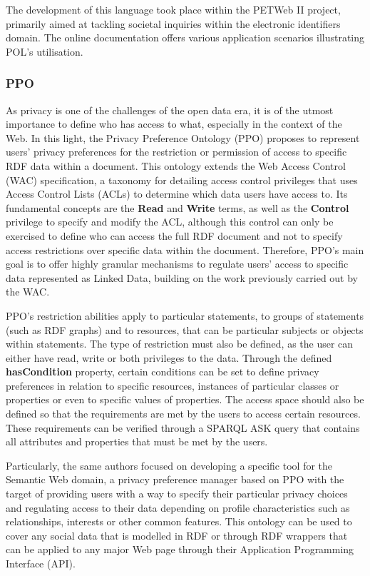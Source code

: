 The development of this language took place within the PETWeb II project, primarily aimed at tackling societal inquiries within the electronic identifiers domain.
The online documentation offers various application scenarios illustrating POL's utilisation.

\subsubsection{PPO}
\label{sec:ppo}
As privacy is one of the challenges of the open data era, it is of the utmost importance to define who has access to what, especially in the context of the Web.
In this light, the Privacy Preference Ontology (PPO) \citep{sacco_privacy_2011} proposes to represent users' privacy preferences for the restriction or permission of access to specific RDF data within a document.
This ontology extends the Web Access Control (WAC) specification, a taxonomy for detailing access control privileges that uses Access Control Lists (ACLs) to determine which data users have access to.
Its fundamental concepts are the \textbf{Read} and \textbf{Write} terms, as well as the \textbf{Control} privilege to specify and modify the ACL, although this control can only be exercised to define who can access the full RDF document and not to specify access restrictions over specific data within the document.
Therefore, PPO's main goal is to offer highly granular mechanisms to regulate users' access to specific data represented as Linked Data, building on the work previously carried out by the WAC.

PPO's restriction abilities apply to particular statements, to groups of statements (such as RDF graphs) and to resources, that can be particular subjects or objects within statements.
The type of restriction must also be defined, as the user can either have read, write or both privileges to the data.
Through the defined \textbf{hasCondition} property, certain conditions can be set to define privacy preferences in relation to specific resources, instances of particular classes or properties or even to specific values of properties.
The access space should also be defined so that the requirements are met by the users to access certain resources.
These requirements can be verified through a SPARQL ASK query that contains all attributes and properties that must be met by the users.

Particularly, the same authors focused on developing a specific tool for the Semantic Web domain, a privacy preference manager \citep{sacco_privacy_2011b} based on PPO with the target of providing users with a way to specify their particular privacy choices and regulating access to their data depending on profile characteristics such as relationships, interests or other common features.
This ontology can be used to cover any social data that is modelled in RDF or through RDF wrappers that can be applied to any major Web page through their Application Programming Interface (API).

